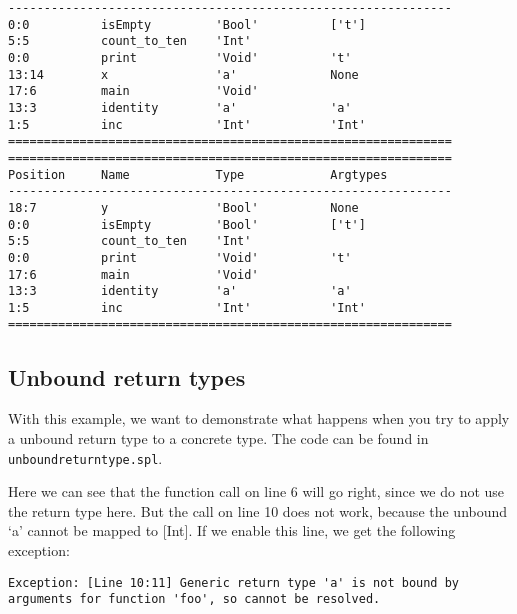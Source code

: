 \documentclass[a4paper]{article}
\begin{document}
\begin{verbatim}
--------------------------------------------------------------
0:0          isEmpty         'Bool'          ['t']               
5:5          count_to_ten    'Int'                               
0:0          print           'Void'          't'                 
13:14        x               'a'             None                
17:6         main            'Void'                              
13:3         identity        'a'             'a'                 
1:5          inc             'Int'           'Int'               
==============================================================
==============================================================
Position     Name            Type            Argtypes            
--------------------------------------------------------------
18:7         y               'Bool'          None                
0:0          isEmpty         'Bool'          ['t']               
5:5          count_to_ten    'Int'                               
0:0          print           'Void'          't'                 
17:6         main            'Void'                              
13:3         identity        'a'             'a'                 
1:5          inc             'Int'           'Int'               
==============================================================
\end{verbatim}


\subsection{Unbound return types}
With this example, we want to demonstrate what happens when you try to apply a unbound return type to a concrete type. The code can be found in {\tt unboundreturntype.spl}. 

Here we can see that the function call on line 6 will go right, since we do not use the return type here. But the call on line 10 does not work, because the unbound `a' cannot be mapped to [Int]. If we enable this line, we get the following exception: 

\begin{verbatim}
Exception: [Line 10:11] Generic return type 'a' is not bound by arguments for function 'foo', so cannot be resolved.
\end{verbatim}
\end{document}
